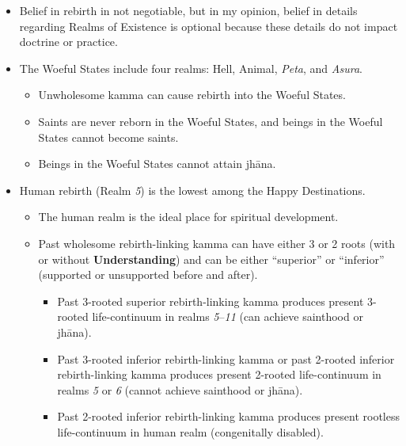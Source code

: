 \begin{itemize}

\item Belief in rebirth in not negotiable, but in my opinion, belief in details regarding Realms of Existence is optional because these details do not impact doctrine or practice.

\item The Woeful States include four realms: Hell, Animal, \textit{Peta}, and \textit{Asura}.

\begin{itemize}

\item Unwholesome kamma can cause rebirth into the Woeful States.

\item Saints are never reborn in the Woeful States, and beings in the Woeful States cannot become saints.

\item Beings in the Woeful States cannot attain jhāna.

\end{itemize}

\item Human rebirth (Realm \textit{5}) is the lowest among the Happy Destinations.

\begin{itemize}

\item The human realm is the ideal place for spiritual development.

\item Past wholesome rebirth-linking kamma can have either 3 or 2 roots (with or without \textbf{Understanding}) and can be either “superior” or “inferior” (supported or unsupported before and after).

\begin{itemize}

\item Past 3-rooted superior rebirth-linking kamma produces present 3-rooted life-continuum in realms \textit{5}--\textit{11} (can achieve sainthood or jhāna).

\item Past 3-rooted inferior rebirth-linking kamma or past 2-rooted inferior rebirth-linking kamma produces present 2-rooted life-continuum in realms \textit{5} or \textit{6} (cannot achieve sainthood or jhāna).

\item Past 2-rooted inferior rebirth-linking kamma produces present rootless life-continuum in human realm (congenitally disabled).


\end{itemize}
\end{itemize}
\end{itemize}
